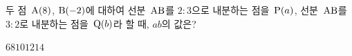 두 점~$\mathrm{A}(8)$, $\mathrm{B}(-2)$에 대하여 선분~$\mathrm{AB}$를 $2:3$으로 내분하는 점을~$\mathrm{P}(a)$, 선분~$\mathrm{AB}$를 $3:2$로 내분하는 점을~$\mathrm{Q}(b)$라 할 때, $ab$의 값은?
\begin{choices32}{$6$}{$8$}{$10$}{$12$}{$14$}\end{choices32}
